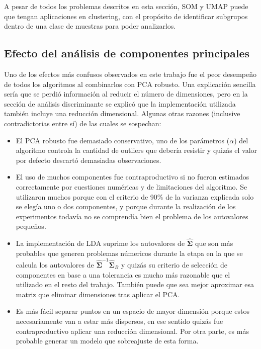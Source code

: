 \documentclass[12pt]{article}
\begin{document}
A pesar de todos los problemas descritos en esta sección, SOM y UMAP puede que tengan aplicaciones en clustering, con el propósito de identificar subgrupos dentro de una clase de muestras para poder analizarlos.

\subsection{Efecto del análisis de componentes principales}

Uno de los efectos más confusos observados en este trabajo fue el peor desempeño de todos los algoritmos al combinarlos con PCA robusto. Una explicación sencilla sería que se perdió información al reducir el número de dimensiones, pero en la sección de análisis discriminante se explicó que la implementación utilizada también incluye una reducción dimensional. Algunas otras razones (inclusive contradictorias entre sí) de las cuales se sospechan:

\begin{itemize}
    \item El PCA robusto fue demasiado conservativo, uno de los parámetros ($\alpha$) del algoritmo controla la cantidad de outliers que debería resistir y quizás el valor por defecto descartó demasiadas observaciones.
    \item El uso de muchos componentes fue contraproductivo si no fueron estimados correctamente por cuestiones numéricas y de limitaciones del algoritmo. Se utilizaron muchos porque con el criterio de 90\% de la varianza explicada solo se elegía uno o dos componentes, y porque durante la realización de los experimentos todavía no se comprendía bien el problema de los autovalores pequeños. 
    \item La implementación de LDA suprime los autovalores de $\hat{\boldsymbol{\Sigma}}$ que son más probables que generen problemas númericos durante la etapa en la que se calcula los autovalores de $\hat{\boldsymbol{\Sigma}}^{-1}\hat{\boldsymbol{\Sigma}}_B$ y quizás su criterio de selección de componentes en base a una tolerancia es mucho más razonable que el utilizado en el resto del trabajo. También puede que sea mejor aproximar esa matriz que eliminar dimensiones tras aplicar el PCA.
    \item Es más fácil separar puntos en un espacio de mayor dimensión porque estos necesariamente van a estar más dispersos, en ese sentido quizás fue contraproductivo aplicar una reducción dimensional. Por otra parte, es más probable generar un modelo que sobreajuste de esta forma.
\end{itemize}
\end{document}
